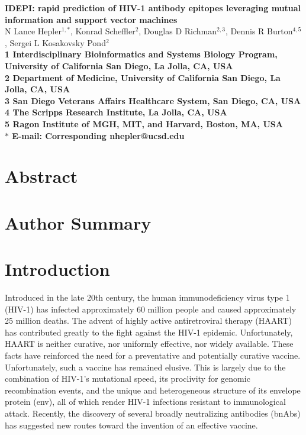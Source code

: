 \documentclass[10pt]{article}
\date{}
\begin{document}
\begin{flushleft}
{\Large
\textbf{{IDEPI}: rapid prediction of HIV-1 antibody epitopes leveraging mutual information and support vector machines}
}
\\
N Lance Hepler$^{1,\ast}$,
Konrad Scheffler$^{2}$,
Douglas D Richman$^{2,3}$,
Dennis R Burton$^{4,5}$,
Sergei L Kosakovsky Pond$^{2}$
\\
\bf{1} Interdisciplinary Bioinformatics and Systems Biology Program, University of California San Diego, La Jolla, CA, USA
\\
\bf{2} Department of Medicine, University of California San Diego, La Jolla, CA, USA
\\
\bf{3} San Diego Veterans Affairs Healthcare System, San Diego, CA, USA
\\
\bf{4} The Scripps Research Institute, La Jolla, CA, USA
\\
\bf{5} Ragon Institute of {MGH}, {MIT}, and Harvard, Boston, MA, USA
\\
$\ast$ E-mail: Corresponding nhepler@ucsd.edu
\end{flushleft}

\section*{Abstract}

\section*{Author Summary}

\section*{Introduction}
Introduced in the late 20th century,
the human immunodeficiency virus type 1 (HIV-1) has infected approximately 60 million people
and caused approximately 25 million deaths.
The advent of highly active antiretroviral therapy ({HAART}) has contributed greatly to the fight against the HIV-1 epidemic.
Unfortunately, HAART is neither curative, nor uniformly effective, nor widely available.
These facts have reinforced the need for a preventative and potentially curative vaccine.
Unfortunately, such a vaccine has remained elusive.
This is largely due to the combination of HIV-1’s mutational speed,
its proclivity for genomic recombination events,
and the unique and heterogeneous structure of its envelope protein (env),
all of which render HIV-1 infections resistant to immunological attack.
Recently, the discovery of several broadly neutralizing antibodies (bnAbs) has suggested new routes toward the invention of an effective vaccine.
\end{document}
